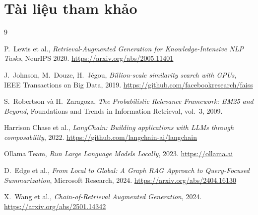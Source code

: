 \documentclass[10pt, conference, a4paper, compsocconf]{IEEEtran}
\begin{document}
\section{Tài liệu tham khảo}
\begin{thebibliography}{9}

P.~Lewis et al., \emph{Retrieval-Augmented Generation for
Knowledge-Intensive NLP Tasks}, NeurIPS 2020.
\url{https://arxiv.org/abs/2005.11401}

J.~Johnson, M.~Douze, H.~Jégou, \emph{Billion-scale similarity search
with GPUs}, IEEE Transactions on Big Data, 2019.
\url{https://github.com/facebookresearch/faiss}

S.~Robertson và H.~Zaragoza, \emph{The Probabilistic Relevance Framework:
BM25 and Beyond}, Foundations and Trends in Information Retrieval, vol.~3,
2009.

Harrison Chase et al., \emph{LangChain: Building applications with LLMs
through composability}, 2022.
\url{https://github.com/langchain-ai/langchain}

Ollama Team, \emph{Run Large Language Models Locally}, 2023.
\url{https://ollama.ai}

D.~Edge et al., \emph{From Local to Global: A Graph RAG Approach to
Query-Focused Summarization}, Microsoft Research, 2024.
\url{https://arxiv.org/abs/2404.16130}

X.~Wang et al., \emph{Chain-of-Retrieval Augmented Generation}, 2024.
\url{https://arxiv.org/abs/2501.14342}

\end{thebibliography}
\end{document}

